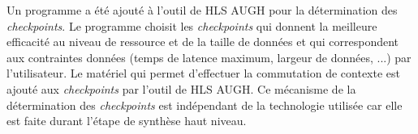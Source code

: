 Un programme a été ajouté à l'outil de HLS AUGH pour la détermination des \emph{checkpoints}.
Le programme choisit les \emph{checkpoints} qui donnent la meilleure efficacité au niveau de ressource
et de la taille de données et qui correspondent aux contraintes données 
(temps de latence maximum, largeur de données, ...) par l'utilisateur.
Le matériel qui permet d'effectuer la commutation de contexte est ajouté aux \emph{checkpoints}
par l'outil de HLS AUGH.
Ce mécanisme de la détermination des \emph{checkpoints} est indépendant de la technologie utilisée car elle
est faite durant l'étape de synthèse haut niveau.
